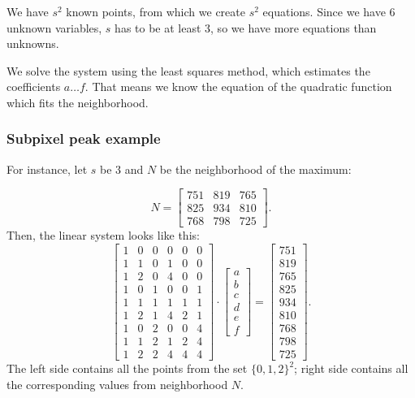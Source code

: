We have $s^2$ known points, from which we create $s^2$ equations. Since we have 6 unknown variables, $s$ has to be at least 3, so we have more equations than unknowns. 

We solve the system using the least squares method, which estimates the coefficients $a \dots f$. That means we know the equation of the quadratic function which fits the neighborhood.

\subsubsection{Subpixel peak example}

For instance, let $s$ be 3 and $N$ be the neighborhood of the maximum:

\[
N =
\begin{bmatrix}
751 & 819 & 765 \\
825 & 934 & 810 \\
768 & 798 & 725
\end{bmatrix}.
\]
Then, the linear system looks like this:
\[
\begin{bmatrix}
1 & 0 & 0 & 0 & 0 & 0\\
1 & 1 & 0 & 1 & 0 & 0\\
1 & 2 & 0 & 4 & 0 & 0\\
1 & 0 & 1 & 0 & 0 & 1\\
1 & 1 & 1 & 1 & 1 & 1\\
1 & 2 & 1 & 4 & 2 & 1\\
1 & 0 & 2 & 0 & 0 & 4\\
1 & 1 & 2 & 1 & 2 & 4\\
1 & 2 & 2 & 4 & 4 & 4
\end{bmatrix}
\cdot
\begin{bmatrix}
a \\ b \\ c \\ d \\ e \\ f
\end{bmatrix}
=
\begin{bmatrix}
751 \\ 819 \\ 765 \\ 825 \\ 934 \\ 810 \\ 768 \\ 798 \\ 725
\end{bmatrix}.
\]
The left side contains all the points from the set $\{0,1,2\}^2$; right side contains all the corresponding values from neighborhood $N$.

